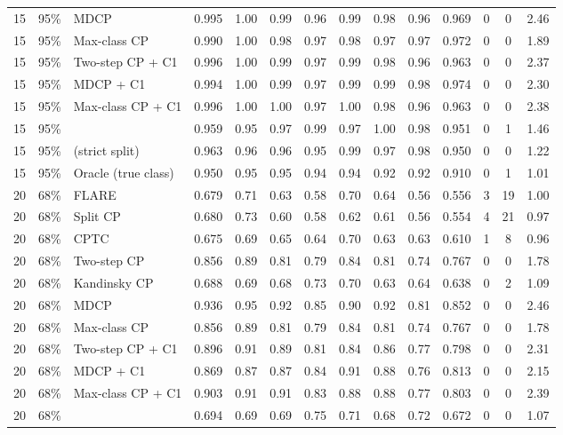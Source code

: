 \begin{longtable}{lllccccccccccc}
15 & 95\% & MDCP & 0.995 & 1.00 & 0.99 & 0.96 & 0.99 & 0.98 & 0.96 & 0.969 & 0 & 0 & 2.46 \\
15 & 95\% & Max-class CP & 0.990 & 1.00 & 0.98 & 0.97 & 0.98 & 0.97 & 0.97 & 0.972 & 0 & 0 & 1.89 \\
15 & 95\% & Two-step CP + C1 & 0.996 & 1.00 & 0.99 & 0.97 & 0.99 & 0.98 & 0.96 & 0.963 & 0 & 0 & 2.37 \\
15 & 95\% & MDCP + C1 & 0.994 & 1.00 & 0.99 & 0.97 & 0.99 & 0.99 & 0.98 & 0.974 & 0 & 0 & 2.30 \\
15 & 95\% & Max-class CP + C1 & 0.996 & 1.00 & 1.00 & 0.97 & 1.00 & 0.98 & 0.96 & 0.963 & 0 & 0 & 2.38 \\
15 & 95\% & \gamut{} & 0.959 & 0.95 & 0.97 & 0.99 & 0.97 & 1.00 & 0.98 & 0.951 & 0 & 1 & 1.46 \\
15 & 95\% & \gamut{} (strict split) & 0.963 & 0.96 & 0.96 & 0.95 & 0.99 & 0.97 & 0.98 & 0.950 & 0 & 0 & 1.22 \\
15 & 95\% & Oracle (true class) & 0.950 & 0.95 & 0.95 & 0.94 & 0.94 & 0.92 & 0.92 & 0.910 & 0 & 1 & 1.01 \\
\midrule
20 & 68\% & FLARE & 0.679 & 0.71 & 0.63 & 0.58 & 0.70 & 0.64 & 0.56 & 0.556 & 3 & 19 & 1.00 \\
20 & 68\% & Split CP & 0.680 & 0.73 & 0.60 & 0.58 & 0.62 & 0.61 & 0.56 & 0.554 & 4 & 21 & 0.97 \\
20 & 68\% & CPTC & 0.675 & 0.69 & 0.65 & 0.64 & 0.70 & 0.63 & 0.63 & 0.610 & 1 & 8 & 0.96 \\
20 & 68\% & Two-step CP & 0.856 & 0.89 & 0.81 & 0.79 & 0.84 & 0.81 & 0.74 & 0.767 & 0 & 0 & 1.78 \\
20 & 68\% & Kandinsky CP & 0.688 & 0.69 & 0.68 & 0.73 & 0.70 & 0.63 & 0.64 & 0.638 & 0 & 2 & 1.09 \\
20 & 68\% & MDCP & 0.936 & 0.95 & 0.92 & 0.85 & 0.90 & 0.92 & 0.81 & 0.852 & 0 & 0 & 2.46 \\
20 & 68\% & Max-class CP & 0.856 & 0.89 & 0.81 & 0.79 & 0.84 & 0.81 & 0.74 & 0.767 & 0 & 0 & 1.78 \\
20 & 68\% & Two-step CP + C1 & 0.896 & 0.91 & 0.89 & 0.81 & 0.84 & 0.86 & 0.77 & 0.798 & 0 & 0 & 2.31 \\
20 & 68\% & MDCP + C1 & 0.869 & 0.87 & 0.87 & 0.84 & 0.91 & 0.88 & 0.76 & 0.813 & 0 & 0 & 2.15 \\
20 & 68\% & Max-class CP + C1 & 0.903 & 0.91 & 0.91 & 0.83 & 0.88 & 0.88 & 0.77 & 0.803 & 0 & 0 & 2.39 \\
20 & 68\% & \gamut{} & 0.694 & 0.69 & 0.69 & 0.75 & 0.71 & 0.68 & 0.72 & 0.672 & 0 & 0 & 1.07 \\

\end{longtable}
